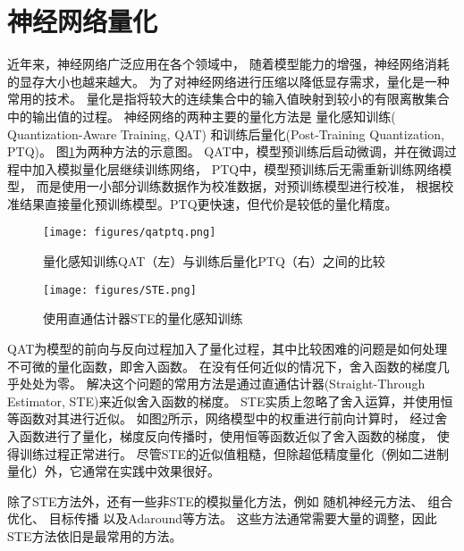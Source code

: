 \section{神经网络量化}

近年来，神经网络广泛应用在各个领域中，
随着模型能力的增强，神经网络消耗的显存大小也越来越大。
为了对神经网络进行压缩以降低显存需求，量化是一种常用的技术。
量化是指将较大的连续集合中的输入值映射到较小的有限离散集合中的输出值的过程\cite{gholami2022survey}。
神经网络的两种主要的量化方法是
量化感知训练( Quantization-Aware Training, QAT)
和训练后量化(Post-Training Quantization, PTQ)。
图\ref{fig:qatptq}为两种方法的示意图。
QAT中，模型预训练后启动微调，并在微调过程中加入模拟量化层继续训练网络，
PTQ中，模型预训练后无需重新训练网络模型，
而是使用一小部分训练数据作为校准数据，对预训练模型进行校准，
根据校准结果直接量化预训练模型。PTQ更快速，但代价是较低的量化精度。
\begin{figure}[htbp]
    \centering
    \texttt{[image: figures/qatptq.png]}
    \caption{量化感知训练QAT（左）与训练后量化PTQ（右）之间的比较\cite{gholami2022survey}}
    \label{fig:qatptq}
\end{figure}

\begin{figure}[htbp]
    \centering
    \texttt{[image: figures/STE.png]}
    \caption{使用直通估计器STE的量化感知训练\cite{gholami2022survey}}
    \label{fig:STE}
\end{figure}

QAT为模型的前向与反向过程加入了量化过程，其中比较困难的问题是如何处理不可微的量化函数，即舍入函数。
在没有任何近似的情况下，舍入函数的梯度几乎处处为零。
解决这个问题的常用方法是通过直通估计器(Straight-Through Estimator, STE)来近似舍入函数的梯度。 
STE实质上忽略了舍入运算，并使用恒等函数对其进行近似。
如图\ref{fig:STE}所示，网络模型中的权重进行前向计算时，
经过舍入函数进行了量化，梯度反向传播时，使用恒等函数近似了舍入函数的梯度，
使得训练过程正常进行。
尽管STE的近似值粗糙，但除超低精度量化（例如二进制量化）外，它通常在实践中效果很好\cite{gholami2022survey}。

除了STE方法外，还有一些非STE的模拟量化方法，例如
随机神经元方法\cite{bengio2013estimating}、
组合优化\cite{friesen2017deep}、
目标传播\cite{lee2015difference}
以及Adaround\cite{nagel2020up}等方法。
这些方法通常需要大量的调整，因此STE方法依旧是最常用的方法。


